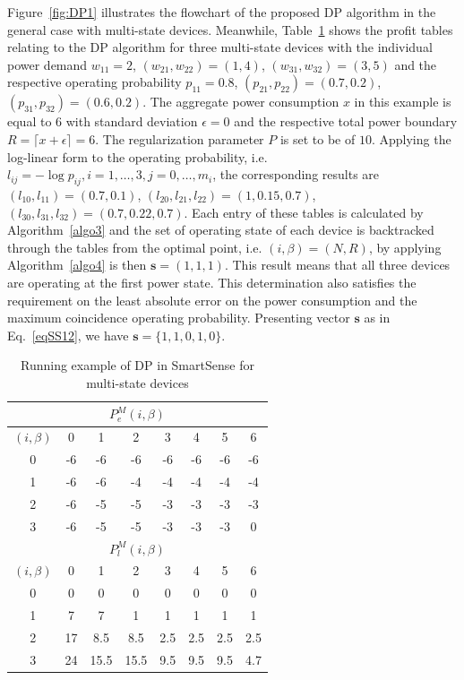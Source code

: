 Figure~\ref{fig:DP1} illustrates the flowchart of the proposed DP algorithm in the general case with multi-state devices. Meanwhile, Table~\ref{table:DP2} shows the profit tables relating to the DP algorithm for three multi-state devices with the individual power demand $w_{11}=2$, $(w_{21},w_{22})=(1,4)$, $(w_{31},w_{32}) = (3,5)$ and the respective operating probability $p_{11} = 0.8$, $(p_{21},p_{22}) = (0.7,0.2)$, $(p_{31},p_{32}) = (0.6,0.2)$. The aggregate power consumption $x$ in this example is equal to 6 with standard deviation $\epsilon=0$ and the respective total power boundary $R = \lceil x+\epsilon \rceil = 6$. The regularization parameter $P$ is set to be of $10$. Applying the log-linear form to the operating probability, i.e. $l_{ij} = -\log{p_{ij}},i=1,\ldots,3,j=0,\ldots,m_i$, the corresponding results are $(l_{10},l_{11}) = (0.7,0.1)$, $(l_{20},l_{21},l_{22}) = (1, 0.15, 0.7)$, $(l_{30},l_{31},l_{32}) = (0.7,0.22,0.7)$. Each entry of these tables is calculated by Algorithm~\ref{algo3} and the set of operating state of each device is backtracked through the tables from the optimal point, i.e. $(i,\beta) = (N,R)$, by applying Algorithm~\ref{algo4} is then $\mathbf{s} = (1,1,1)$. This result means that all three devices are operating at the first power state. This determination also satisfies the requirement on the least absolute error on the power consumption and the maximum coincidence operating probability. Presenting vector $\mathbf{s}$ as in Eq.~\ref{eqSS12}, we have $\mathbf{s} = \{1,1,0,1,0\}$.
\begin{table}
\caption{Running example of DP in SmartSense for multi-state devices}\label{table:DP2}
\begin{center}
\begin{tabular}{|c|c|c|c|c|c|c|c|}
\hline
\multicolumn{8}{|c|}{$P^M_e(i,\beta)$}\\ \hline 
$(i,\beta)$&0&1&2&3&4&5&6\\ \hline
0&-6&-6&-6&-6&-6&-6&-6 \\ \hline
1&-6&-6&-4&-4&-4&-4&-4 \\ \hline
2&-6&-5&-5&-3&-3&-3&-3 \\ \hline
3&-6&-5&-5&-3&-3&-3&0 \\ \hline
\multicolumn{8}{|c|}{$P^M_l(i,\beta)$}\\ \hline 
$(i,\beta)$&0&1&2&3&4&5&6\\ \hline
0&0&0&0&0&0&0&0 \\ \hline
1&7&7&1&1&1&1&1\\ \hline
2&17&8.5&8.5&2.5&2.5&2.5&2.5\\ \hline
3&24&15.5&15.5&9.5&9.5&9.5&4.7\\ \hline
\end{tabular}
\end{center}
\end{table}

